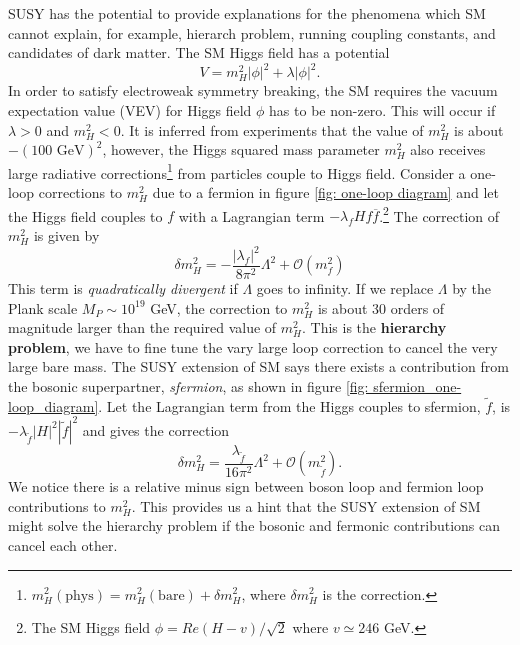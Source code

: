 \documentclass[12pt]{report}
\begin{document}
SUSY has the potential to provide explanations for the phenomena which SM cannot explain, for example, hierarch problem, running coupling constants, and candidates of dark matter.
The SM Higgs field has a potential
\begin{equation}
V = m^{2}_{H} |\phi|^{2} + \lambda |\phi|^{2} .
\end{equation}
In order to satisfy electroweak symmetry breaking, the SM requires the vacuum expectation value (VEV) for Higgs field $\phi$ has to be non-zero.
This will occur if $\lambda > 0$ and $m^{2}_{H} < 0$.
It is inferred from experiments that the value of $m^{2}_{H}$ is about $-(100 \textrm{ GeV})^2$, however, the Higgs squared mass parameter $m^{2}_{H}$ also receives large radiative corrections\footnote{$m^{2}_{H} (\textrm{phys}) = m^{2}_{H} (\textrm{bare}) + \delta m^{2}_{H}$, where $\delta m^{2}_{H}$ is the correction.} from particles couple to Higgs field.
Consider a one-loop corrections to $m^{2}_{H}$ due to a fermion in figure \ref{fig: one-loop diagram} and let the Higgs field couples to $f$ with a Lagrangian term $-\lambda_{f} H f \overline{f}$.\footnote{The SM Higgs field $\phi =Re(H - v)/\sqrt{2}$ where $v \simeq 246$ GeV.}
The correction of $m^{2}_{H}$ is given by
\begin{equation}
\delta m^{2}_{H} = - \frac{|\lambda_{f}|^2}{8 \pi^{2}} \Lambda^{2} + \mathcal{O}(m^{2}_{f})
\end{equation}
This term is \textit{quadratically divergent} if $\Lambda$ goes to infinity.
If we replace $\Lambda$ by the Plank scale $M_{P} \sim 10^{19}$ GeV, the correction to $m^{2}_{H}$ is about 30 orders of magnitude larger than the required value of $m^{2}_{H}$.
This is the \textbf{hierarchy problem}, we have to fine tune the vary large loop correction to cancel the very large bare mass.
The SUSY extension of SM says there exists a contribution from the bosonic superpartner, \textit{sfermion}, as shown in figure \ref{fig: sfermion_one-loop_diagram}.
Let the Lagrangian term from the Higgs couples to sfermion, $\widetilde{f}$, is $-\lambda_{\widetilde{f}} |H|^{2} |\widetilde{f}|^{2}$ and gives the correction
\begin{equation}
\delta m^{2}_{H} = \frac{\lambda_{\widetilde{f}}}{16 \pi^{2}} \Lambda^{2} + \mathcal{O}(m^{2}_{\widetilde{f}}) .
\end{equation}
We notice there is a relative minus sign between boson loop and fermion loop contributions to $m^{2}_{H}$.
This provides us a hint that the SUSY extension of SM might solve the hierarchy problem if the bosonic and fermonic contributions can cancel each other.
\end{document}
